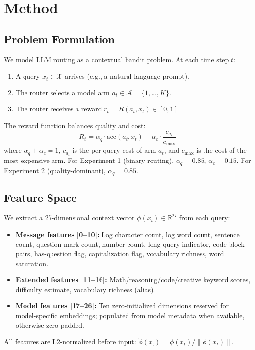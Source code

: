 \section{Method}
\label{sec:method}

\subsection{Problem Formulation}

We model LLM routing as a contextual bandit problem. At each time step $t$:
\begin{enumerate}
    \item A query $x_t \in \mathcal{X}$ arrives (e.g., a natural language prompt).
    \item The router selects a model arm $a_t \in \mathcal{A} = \{1, \ldots, K\}$.
    \item The router receives a reward $r_t = R(a_t, x_t) \in [0, 1]$.
\end{enumerate}

The reward function balances quality and cost:
\begin{equation}
R_t = \alpha_q \cdot \text{acc}(a_t, x_t) - \alpha_c \cdot \frac{c_{a_t}}{c_{\max}}
\end{equation}
where $\alpha_q + \alpha_c = 1$, $c_{a_t}$ is the per-query cost of arm $a_t$, and $c_{\max}$ is the cost of the most expensive arm. For Experiment 1 (binary routing), $\alpha_q = 0.85$, $\alpha_c = 0.15$. For Experiment 2 (quality-dominant), $\alpha_q = 0.85$.

\subsection{Feature Space}
\label{sec:features}

We extract a 27-dimensional context vector $\phi(x_t) \in \mathbb{R}^{27}$ from each query:
\begin{itemize}
    \item \textbf{Message features [0--10]:} Log character count, log word count, sentence count, question mark count, number count, long-query indicator, code block pairs, has-question flag, capitalization flag, vocabulary richness, word saturation.
    \item \textbf{Extended features [11--16]:} Math/reasoning/code/creative keyword scores, difficulty estimate, vocabulary richness (alias).
    \item \textbf{Model features [17--26]:} Ten zero-initialized dimensions reserved for model-specific embeddings; populated from model metadata when available, otherwise zero-padded.
\end{itemize}
All features are L2-normalized before input: $\tilde{\phi}(x_t) = \phi(x_t) / \|\phi(x_t)\|$.

